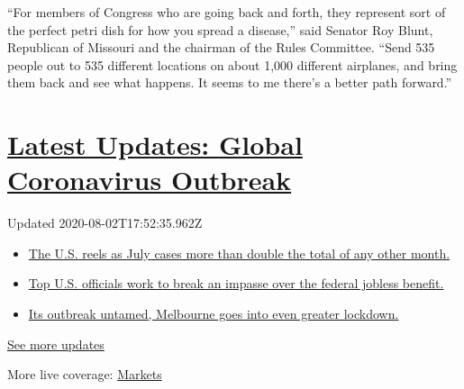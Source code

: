 ``For members of Congress who are going back and forth, they represent
sort of the perfect petri dish for how you spread a disease,'' said
Senator Roy Blunt, Republican of Missouri and the chairman of the Rules
Committee. ``Send 535 people out to 535 different locations on about
1,000 different airplanes, and bring them back and see what happens. It
seems to me there's a better path forward.''

\hypertarget{latest-updates-global-coronavirus-outbreak}{%
\section{\texorpdfstring{\href{https://www.nytimes3xbfgragh.onion/2020/08/01/world/coronavirus-covid-19.html?action=click\&pgtype=Article\&state=default\&region=MAIN_CONTENT_1\&context=storylines_live_updates}{Latest
Updates: Global Coronavirus
Outbreak}}{Latest Updates: Global Coronavirus Outbreak}}\label{latest-updates-global-coronavirus-outbreak}}

Updated 2020-08-02T17:52:35.962Z

\begin{itemize}
\tightlist
\item
  \href{https://www.nytimes3xbfgragh.onion/2020/08/01/world/coronavirus-covid-19.html?action=click\&pgtype=Article\&state=default\&region=MAIN_CONTENT_1\&context=storylines_live_updates\#link-34047410}{The
  U.S. reels as July cases more than double the total of any other
  month.}
\item
  \href{https://www.nytimes3xbfgragh.onion/2020/08/01/world/coronavirus-covid-19.html?action=click\&pgtype=Article\&state=default\&region=MAIN_CONTENT_1\&context=storylines_live_updates\#link-780ec966}{Top
  U.S. officials work to break an impasse over the federal jobless
  benefit.}
\item
  \href{https://www.nytimes3xbfgragh.onion/2020/08/01/world/coronavirus-covid-19.html?action=click\&pgtype=Article\&state=default\&region=MAIN_CONTENT_1\&context=storylines_live_updates\#link-2bc8948}{Its
  outbreak untamed, Melbourne goes into even greater lockdown.}
\end{itemize}

\href{https://www.nytimes3xbfgragh.onion/2020/08/01/world/coronavirus-covid-19.html?action=click\&pgtype=Article\&state=default\&region=MAIN_CONTENT_1\&context=storylines_live_updates}{See
more updates}

More live coverage:
\href{https://www.nytimes3xbfgragh.onion/live/2020/07/31/business/stock-market-today-coronavirus?action=click\&pgtype=Article\&state=default\&region=MAIN_CONTENT_1\&context=storylines_live_updates}{Markets}

